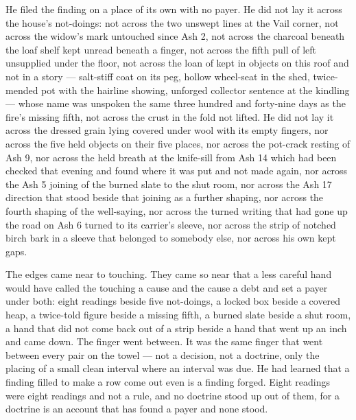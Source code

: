 He filed the finding on a place of its own with no payer. He did not lay it across the house's not-doings: not across the two unswept lines at the Vail corner, not across the widow's mark untouched since Ash 2, not across the charcoal beneath the loaf shelf kept unread beneath a finger, not across the fifth pull of  left unsupplied under the floor, not across the loan of  kept in objects on this roof and not in a story --- salt-stiff coat on its peg, hollow wheel-seat in the shed, twice-mended pot with the hairline showing, unforged collector sentence at the kindling --- whose name was unspoken the same three hundred and forty-nine days as the fire's missing fifth, not across the crust in the fold not lifted. He did not lay it across the dressed grain lying covered under wool with its empty fingers, nor across the five held objects on their five places, nor across the pot-crack resting of Ash 9, nor across the held breath at the knife-sill from Ash 14 which had been checked that evening and found where it was put and not made again, nor across the Ash 5 joining of the burned slate to the shut room, nor across the Ash 17 direction that stood beside that joining as a further shaping, nor across the fourth shaping of the well-saying, nor across the turned writing that had gone up the road on Ash 6 turned to its carrier's sleeve, nor across the strip of notched birch bark in a sleeve that belonged to somebody else, nor across his own kept gaps.

The edges came near to touching. They came so near that a less careful hand would have called the touching a cause and the cause a debt and set a payer under both: eight readings beside five not-doings, a locked box beside a covered heap, a twice-told figure beside a missing fifth, a burned slate beside a shut room, a hand that did not come back out of a strip beside a hand that went up an inch and came down. The finger went between. It was the same finger that went between every pair on the towel --- not a decision, not a doctrine, only the placing of a small clean interval where an interval was due. He had learned that a finding filled to make a row come out even is a finding forged. Eight readings were eight readings and not a rule, and no doctrine stood up out of them, for a doctrine is an account that has found a payer and none stood.

